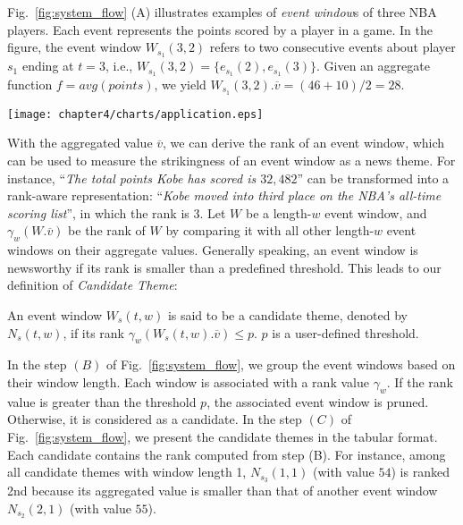 \begin{example}
Fig.~\ref{fig:system_flow} (A) illustrates examples of \textit{event window}s of three NBA players. 
Each event represents the points scored by a player in a game. 
In the figure, the event window $W_{s_1}(3,2)$ refers to two consecutive events about player $s_1$ ending at $t=3$, i.e., $W_{s_1}(3,2)=\{e_{s_1}(2), e_{s_1}(3)\}$. Given an aggregate function $f=avg(points)$,  we yield $W_{s_1}(3,2).\overline{v}=(46+10)/2=28$.
\end{example}

\begin{figure*}[t]
\centering
\texttt{[image: chapter4/charts/application.eps]}
	\caption{An illustration sketch discovery workflow. 
(A): various event windows are formed based on events' sequence IDs. 
(B): event windows with rank greater than $p$ are filtered.
(C): best ranked event windows form candidate themes.
(D): $k$-sketches are discovered for each subject from their candidate themes.
(E): subject related news can be generated from each $k$-sketch.
}
\label{fig:system_flow}
\end{figure*}

With the aggregated value $\overline{v}$, we can derive the rank of an event window, which can be used to measure the strikingness of an event window as a news theme.  For instance, ``\textit{The total points Kobe has scored is $32,482$}'' can be transformed into a rank-aware representation: ``\textit{Kobe moved into third place on the NBA's all-time scoring list}'', in which the rank is $3$. Let $W$ be a length-$w$ event window, and 
 $\gamma_w(W.\overline{v})$ be the rank of $W$ by comparing it with all other
length-$w$ event windows on their aggregate values. Generally speaking, an event window is newsworthy if its rank is smaller than a predefined threshold. This leads to our definition of \emph{Candidate Theme}:
%

\begin{definition} 
An event window $W_s(t,w)$ is said to be a candidate theme, denoted by $N_s(t,w)$, if its rank $\gamma_w(W_s(t,w).\overline{v}) \leq p$. $p$ is a user-defined threshold.

\end{definition} 

\begin{example}
In the step $(B)$ of Fig.~\ref{fig:system_flow}, we group the event windows based on their window length. Each window is associated with a rank value $\gamma_w$. If the rank value is greater than the threshold $p$, the associated event window is pruned. Otherwise, it is considered as a candidate. In the step $(C)$ of  Fig.~\ref{fig:system_flow}, we present the candidate themes  in the tabular format. Each candidate contains the rank computed from step (B). For instance, among all candidate themes with window length 1, $N_{s_3}(1,1)$ (with value $54$) is ranked 2nd because its aggregated value is smaller than that of another event window $N_{s_2}(2,1)$ (with value $55$). %
\end{example}

